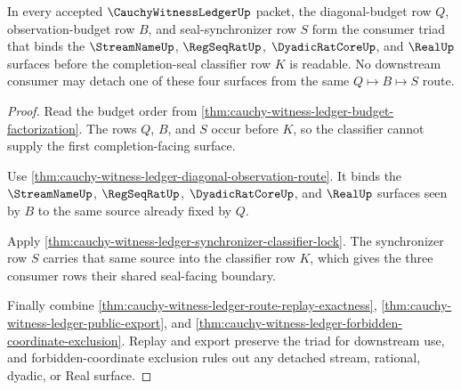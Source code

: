 \begin{theorem}
\label{thm:cauchy-witness-ledger-window-seal-consumer-triad}
In every accepted $\CauchyWitnessLedgerUp$ packet, the diagonal-budget row
$Q$, observation-budget row $B$, and seal-synchronizer row $S$ form the
consumer triad that binds the $\StreamNameUp$, $\RegSeqRatUp$,
$\DyadicRatCoreUp$, and $\RealUp$ surfaces before the completion-seal
classifier row $K$ is readable. No downstream consumer may detach one of
these four surfaces from the same $Q \longmapsto B \longmapsto S$ route.
\end{theorem}
\begin{proof}
Read the budget order from
\autoref{thm:cauchy-witness-ledger-budget-factorization}. The rows $Q$, $B$,
and $S$ occur before $K$, so the classifier cannot supply the first
completion-facing surface.

Use \autoref{thm:cauchy-witness-ledger-diagonal-observation-route}. It binds
the $\StreamNameUp$, $\RegSeqRatUp$, $\DyadicRatCoreUp$, and $\RealUp$
surfaces seen by $B$ to the same source already fixed by $Q$.

Apply \autoref{thm:cauchy-witness-ledger-synchronizer-classifier-lock}. The
synchronizer row $S$ carries that same source into the classifier row $K$,
which gives the three consumer rows their shared seal-facing boundary.

Finally combine \autoref{thm:cauchy-witness-ledger-route-replay-exactness},
\autoref{thm:cauchy-witness-ledger-public-export}, and
\autoref{thm:cauchy-witness-ledger-forbidden-coordinate-exclusion}. Replay and
export preserve the triad for downstream use, and forbidden-coordinate
exclusion rules out any detached stream, rational, dyadic, or Real surface.
\end{proof}

